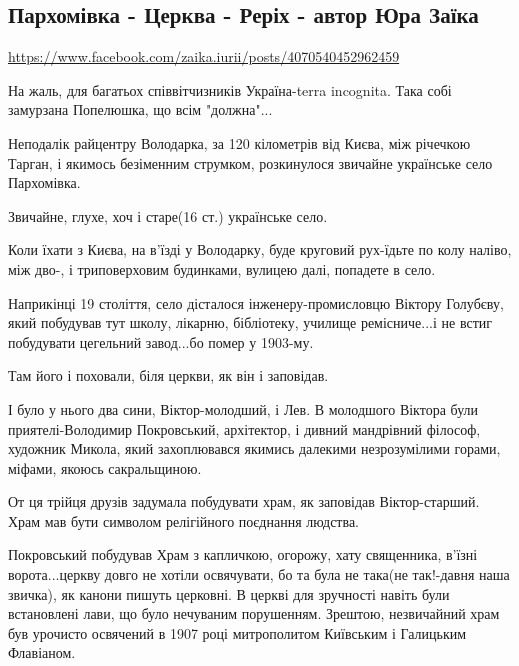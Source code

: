  


\subsection{Пархомівка - Церква - Реріх - автор Юра Заїка}

\url{https://www.facebook.com/zaika.iurii/posts/4070540452962459}

На жаль, для багатьох співвітчизників Україна-terra incognita.  Така собі
замурзана Попелюшка, що всім "должна"...

Неподалік райцентру Володарка, за 120 кілометрів від  Києва, між річечкою
Тарган, і якимось безіменним струмком, розкинулося звичайне українське село
Пархомівка. 

Звичайне, глухе, хоч і старе(16 ст.) українське село.

Коли їхати з Києва, на в'їзді у Володарку, буде круговий рух-їдьте по колу
наліво, між дво-, і триповерховим будинками, вулицею далі, попадете в село.

Наприкінці 19 століття, село дісталося інженеру-промисловцю Віктору Голубєву,
який побудував тут школу, лікарню, бібліотеку, училище ремісниче...і не встиг
побудувати цегельний завод...бо помер у 1903-му.

Там його і поховали, біля церкви, як він і заповідав.

І було у нього два сини, Віктор-молодший, і Лев. В молодшого Віктора були
приятелі-Володимир Покровський, архітектор, і дивний мандрівний філософ,
художник Микола, який захоплювався якимись далекими незрозумілими горами,
міфами, якоюсь сакральщиною. 

От ця трійця друзів задумала побудувати храм, як заповідав Віктор-старший. Храм
мав бути символом релігійного поєднання людства.

Покровський побудував Храм з капличкою, огорожу, хату священника, в'їзні
ворота...церкву довго не хотіли освячувати, бо та була не така(не так!-давня
наша звичка), як канони пишуть церковні. В церкві для зручності навіть були
встановлені лави, що було нечуваним порушенням. Зрештою, незвичайний храм був
урочисто освячений в 1907 році митрополитом Київським і Галицьким Флавіаном.

